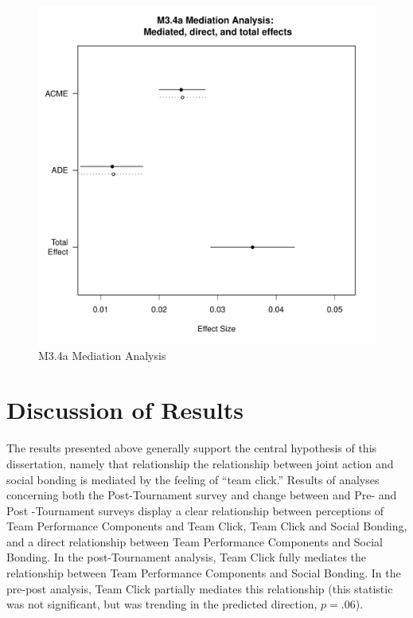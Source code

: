 \begin{CJK}{UTF8}{gbsn}
    \begin{figure}[htbp]
      \includegraphics[scale=.5]{images/MLM34aMediationAnalysis.pdf}
      \caption{M3.4a Mediation Analysis}
      \label{fig:MLM34aMediationAnalysis}
    \end{figure}



\clearpage

























\section{Discussion of Results}

  The results presented above generally support the central hypothesis of this dissertation, namely that relationship the relationship between joint action and social bonding is mediated by the feeling of ``team click.''  Results of analyses concerning both the Post-Tournament survey and change between and Pre- and Post -Tournament surveys display a clear relationship between perceptions of Team Performance Components and Team Click, Team Click and Social Bonding, and a direct relationship between Team Performance Components and Social Bonding.  In the post-Tournament analysis, Team Click fully mediates the relationship between Team Performance Components and Social Bonding. In the pre-post analysis, Team Click partially mediates this relationship (this statistic was not significant, but was trending in the predicted direction, $p = .06$).


\end{CJK}
